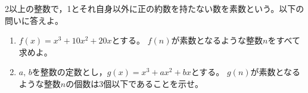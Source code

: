 \documentclass[../../main.tex]{subfiles}
\begin{document}
2以上の整数で，1とそれ自身以外に正の約数を持たない数を素数という。以下の問いに答えよ。
\begin{enumerate}
  \item$f(x)=x^3+10x^2+20x$とする。
    $f(n)$が素数となるような整数$n$をすべて求めよ。
  \item$a, \, b$を整数の定数とし，$g(x)=x^3+ax^2+bx$とする。
    $g(n)$が素数となるような整数$n$の個数は3個以下であることを示せ。
\end{enumerate}
\end{document}
